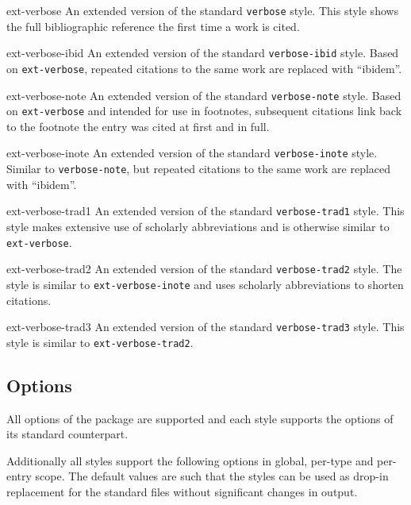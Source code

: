 \documentclass{ltxdockit}
\begin{document}
\begin{marglist}
\item[ext-verbose]
An extended version of the standard \texttt{verbose} style.
This style shows the full bibliographic reference the first time a work is
cited.

\item[ext-verbose-ibid]
An extended version of the standard \texttt{verbose-ibid} style.
Based on \texttt{ext-verbose}, repeated citations to the same work are replaced
with \enquote{ibidem}.

\item[ext-verbose-note]
An extended version of the standard \texttt{verbose-note} style.
Based on \texttt{ext-verbose} and intended for use in footnotes, subsequent
citations link back to the footnote the entry was cited at first and in full.

\item[ext-verbose-inote]
An extended version of the standard \texttt{verbose-inote} style.
Similar to \texttt{verbose-note}, but repeated citations to the same work are
replaced with \enquote{ibidem}.

\item[ext-verbose-trad1]
An extended version of the standard \texttt{verbose-trad1} style.
This style makes extensive use of scholarly abbreviations and is otherwise
similar to \texttt{ext-verbose}.

\item[ext-verbose-trad2]
An extended version of the standard \texttt{verbose-trad2} style.
The style is similar to \texttt{ext-\hspace{0pt}verbose-\hspace{0pt}inote} and
uses scholarly abbreviations to shorten citations.

\item[ext-verbose-trad3]
An extended version of the standard \texttt{verbose-trad3} style.
This style is similar to \texttt{ext-\hspace{0pt}verbose-\hspace{0pt}trad2}.
\end{marglist}


\subsection{Options}
All options of the  package are supported and each style supports
the options of its standard counterpart.

Additionally all styles support the following options in global, per-type and
per-entry scope.
The default values are such that the styles can be used as drop-in replacement
for the standard files without significant changes in output.
\end{document}
